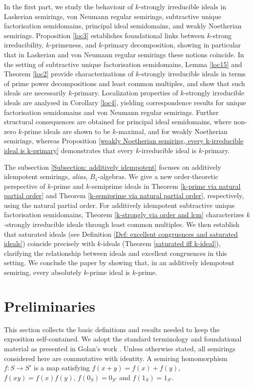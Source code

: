 \documentclass[11pt,leqno]{amsart}
\theoremstyle{definition}
\numberwithin{equation}{section}
\begin{document}
In the first part, we study the behaviour of $k$-strongly irreducible ideals in Laskerian semirings, von Neumann regular semirings, subtractive unique factorisation semidomains, principal ideal semidomains, and weakly Noetherian semirings. Proposition \ref{loc3} establishes foundational links between $k$-strong irreducibility, $k$-primeness, and $k$-primary decomposition, showing in particular that in Laskerian and von Neumann regular semirings these notions coincide. In the setting of subtractive unique factorisation semidomains, Lemma \ref{loc15} and Theorem \ref{loc2} provide characterizations of $k$-strongly irreducible ideals in terms of prime power decompositions and least common multiples, and show that such ideals are necessarily $k$-primary. Localization properties of $k$-strongly irreducible ideals are analysed in Corollary \ref{loc4}, yielding correspondence results for unique factorisation semidomains and von Neumann regular semirings. Further structural consequences are obtained for principal ideal semidomains, where non-zero $k$-prime ideals are shown to be $k$-maximal, and for weakly Noetherian semirings, whereas Proposition \ref{weakly Noetherian semiring, every k-irreducible ideal is k-primary} demonstrates that every $k$-irreducible ideal is $k$-primary.

The subsection \ref{Subsection: additively idempotent} focuses on additively idempotent semirings, \textit{alias}, $B_1$-algebras. We give a new order-theoretic perspective of $k$-prime and $k$-semiprime ideals in Theorem \ref{k-prime via natural partial order} and Theorem \ref{k-semiprime via natural partial order}, respectively, using the natural partial order. For additively idempotent subtractive unique factorisation semidomains, Theorem \ref{k-strongly via order and lcm} characterizes $k$-strongly irreducible ideals through least common multiples. We then establish that saturated ideals (see Definition \ref{Def: excellent congruences and saturated ideals}) coincide precisely with $k$-ideals (Theorem \ref{saturated iff k-ideal}), clarifying the relationship between ideals and excellent congruences in this setting. We conclude the paper by showing that, in an additively idempotent semiring, every absolutely $k$-prime ideal is $k$-prime.

\section{Preliminaries}\label{prim} 
This section collects the basic definitions and results needed to keep the exposition self-contained. We adopt the standard terminology and foundational material as presented in Golan’s work \cite{Golan}. 
Unless otherwise stated, all semirings considered here are commutative with identity. A semiring homomorphism $f\colon S\rightarrow S'$ is a map satisfying $f(x+y)=f(x)+f(y)$, $f(xy)=f(x)f(y)$, $f(0_S)=0_{S'}$ and $f(1_S)=1_{S'}$. 
\end{document}
